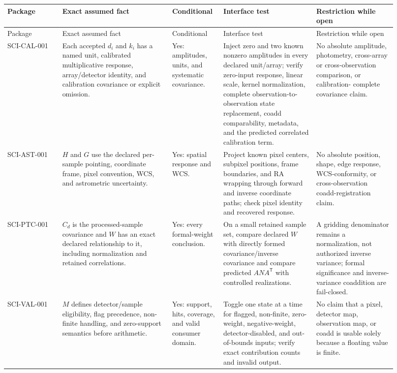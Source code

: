 \documentclass[11pt]{article}
\newcommand{\trans}{\mathsf{T}}
\begin{document}
\begin{longtable}{L{0.13\linewidth}L{0.26\linewidth}L{0.12\linewidth}L{0.22\linewidth}L{0.19\linewidth}}
\toprule
Package & Exact assumed fact & Conditional & Interface test &
Restriction while open\\
\midrule
\endfirsthead
\toprule
Package & Exact assumed fact & Conditional & Interface test &
Restriction while open\\
\midrule
\endhead
SCI-CAL-001 & Each accepted \(d_i\) and \(k_i\) has a named unit, calibrated
multiplicative response, array/detector identity, and calibration covariance or
explicit omission. & Yes: amplitudes, units, and systematic covariance. &
Inject zero and two known nonzero amplitudes in every declared unit/array;
verify zero-input response, linear scale, kernel normalization, complete
observation-to-observation state replacement, coadd comparability, metadata,
and the predicted correlated calibration term. & No absolute amplitude,
photometry, cross-array or cross-observation comparison, or calibration-
complete covariance claim.\\
SCI-AST-001 & \(H\) and \(G\) use the declared per-sample pointing, coordinate
frame, pixel convention, WCS, and astrometric uncertainty. & Yes: spatial
response and WCS. & Project known pixel centers, subpixel positions, frame
boundaries, and RA wrapping through forward and inverse coordinate paths; check
pixel identity and recovered response. & No absolute position, shape, edge
response, WCS-conformity, or cross-observation coadd-registration claim.\\
SCI-PTC-001 & \(C_d\) is the processed-sample covariance and \(W\) has an exact
declared relationship to it, including normalization and retained correlations.
& Yes: every formal-weight conclusion. & On a small retained sample set,
compare declared \(W\) with directly formed covariance/inverse covariance and
compare predicted \(A N A^\trans\) with controlled realizations. & A gridding
denominator remains a normalization, not authorized inverse variance; formal
significance and inverse-variance coaddition are fail-closed.\\
SCI-VAL-001 & \(M\) defines detector/sample eligibility, flag precedence,
non-finite handling, and zero-support semantics before arithmetic. & Yes:
support, hits, coverage, and valid consumer domain. & Toggle one state at a
time for flagged, non-finite, zero-weight, negative-weight, detector-disabled,
and out-of-bounds inputs; verify exact contribution counts and invalid output.
& No claim that a pixel, detector map, observation map, or coadd is usable
solely because a floating value is finite.\\
\bottomrule
\end{longtable}
\end{document}
